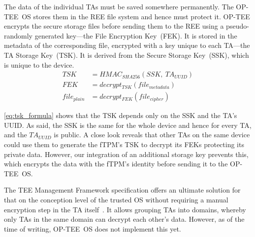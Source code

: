 The data of the individual \acp{TA} must be saved somewhere permanently.
The OP-TEE~OS stores them in the \ac{REE} file system and hence must protect it.
OP-TEE encrypts the secure storage files before sending them to the \ac{REE} using a pseudo-randomly generated key---the File Encryption Key~(FEK).
It is stored in the metadata of the corresponding file, encrypted with a key unique to each \ac{TA}---the \ac{TA} Storage Key~(TSK). %
It is derived from the Secure Storage Key~(SSK), which is unique to the device.
\begin{align}
  \label{eq:tsk_formula}
  TSK &= HMAC_{SHA256}(SSK,\ TA_{UUID})\\
  \label{eq:fek_formula}
  FEK &= decrypt_{TSK}(file_{metadata})\\
  file_{plain} &= decrypt_{FEK}(file_{cipher})
\end{align}

\autoref{eq:tsk_formula} shows that the TSK depends only on the SSK and the TA's UUID\@.
As said, the SSK is the same for the whole device and hence for every TA, and the \( TA_{UUID} \) is public.
A close look reveals that other \acp{TA} on the same device could use them to generate the fTPM's TSK to decrypt its FEKs protecting its private data.
However, our integration of an additional storage key prevents this, which encrypts the data with the fTPM's identity before sending it to the OP-TEE~OS\@.

The TEE Management Framework specification offers an ultimate solution for that on the conception level of the trusted OS without requiring a manual encryption step in the TA itself~\cite{GP_ManagementFramework}.
It allows grouping TAs into domains, whereby only TAs in the same domain can decrypt each other's data.
However, as of the time of writing, OP-TEE~OS does not implement this yet.

